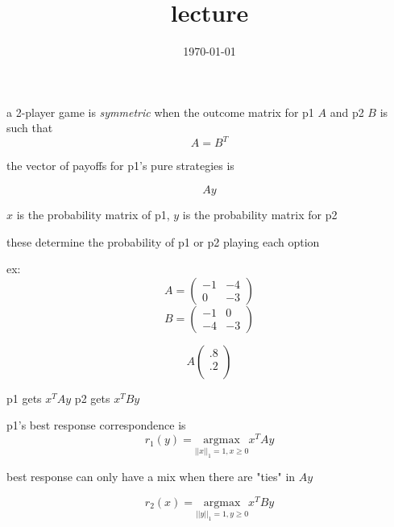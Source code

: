 \documentclass{article}
\title{lecture}
\date{\today}
\theoremstyle{definition}
\begin{document}
\maketitle

a 2-player game is \emph{symmetric} when the outcome matrix for p1 \(A\) and p2 \(B\) is such that 
\begin{equation}
    A= B^T
\end{equation}

the vector of payoffs for p1's pure strategies is 

\begin{equation}
    Ay
\end{equation}

\(x\) is the probability matrix of p1, \(y \) is the probability matrix for p2

these determine the probability of p1 or p2 playing each option


ex: 
\begin{equation}
    A=
    \begin{pmatrix}
        -1&-4\\
        0&-3
    \end{pmatrix}
\end{equation}
\begin{equation}
    B=
    \begin{pmatrix}
        -1&0\\
        -4&-3
    \end{pmatrix}
\end{equation}

\begin{equation}
    A\begin{pmatrix}
        .8\\
        .2\\
    \end{pmatrix}
\end{equation}


p1 gets \(x^TAy\)
p2 gets \(x^TBy\)


p1's best response correspondence is 
\begin{equation}
    r_1(y)=\underset{\vert\vert x \vert \vert_1=1, x\geq0}{\text{argmax}} x^TAy
\end{equation}

best response can only have a mix when there are "ties" in \(Ay\)

\begin{equation}
    r_2(x)=\underset{\vert\vert y \vert \vert_1=1, y\geq0}{\text{argmax}} x^TBy
\end{equation}
\end{document}
